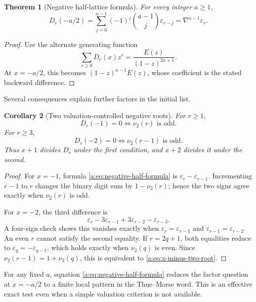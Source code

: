 \documentclass[11pt,a4paper,oneside,openany]{book}
\numberwithin{equation}{chapter}
\newtheorem{theorem}{Theorem}[chapter]
\newtheorem{corollary}[theorem]{Corollary}
\theoremstyle{definition}
\theoremstyle{remark}
\newcommand{\eps}{\varepsilon}
\newcommand{\nuTwo}{\nu_2}
\newcommand{\Diag}{D}
\begin{document}
\begin{theorem}[Negative half-lattice formula]\label{a:thm:negative-half}
For every integer \(a\ge1\),
\begin{equation}
 \boxed{
 \Diag_r(-a/2)
 =\sum_{j=0}^{a-1}(-1)^j\binom{a-1}{j}\eps_{r-j}
 =\nabla^{a-1}\eps_r.}
 \label{a:eq:negative-half-formula}
\end{equation}
\end{theorem}

\begin{proof}
Use the alternate generating function
\[
 \sum_{r\ge0}\Diag_r(x)z^r
 =\frac{E(z)}{(1-z)^{2x+1}}.
\]
At \(x=-a/2\), this becomes \((1-z)^{a-1}E(z)\), whose coefficient is the
stated backward difference.
\end{proof}

Several consequences explain further factors in the initial list.

\begin{corollary}[Two valuation-controlled negative roots]\label{a:cor:valuation-roots}
For \(r\ge1\),
\begin{equation}
 \Diag_r(-1)=0
 \iff \nuTwo(r)\text{ is odd}.
 \label{a:eq:x-minus-one-root}
\end{equation}
For \(r\ge3\),
\begin{equation}
 \Diag_r(-2)=0
 \iff \nuTwo(r-1)\text{ is odd}.
 \label{a:eq:x-minus-two-root}
\end{equation}
Thus \(x+1\) divides \(\Diag_r\) under the first condition, and \(x+2\)
divides it under the second.
\end{corollary}

\begin{proof}
For \(x=-1\), formula \eqref{a:eq:negative-half-formula} is
\(\eps_r-\eps_{r-1}\).  Incrementing \(r-1\) to \(r\) changes the binary
digit sum by \(1-\nuTwo(r)\); hence the two signs agree exactly when
\(\nuTwo(r)\) is odd.

For \(x=-2\), the third difference is
\[
 \eps_r-3\eps_{r-1}+3\eps_{r-2}-\eps_{r-3}.
\]
A four-sign check shows this vanishes exactly when
\(\eps_r=\eps_{r-3}\) and \(\eps_{r-1}=\eps_{r-2}\).  An even \(r\) cannot
satisfy the second equality.  If \(r=2q+1\), both equalities reduce to
\(\eps_q=-\eps_{q-1}\), which holds exactly when \(\nuTwo(q)\) is even.
Since \(\nuTwo(r-1)=1+\nuTwo(q)\), this is equivalent to
\eqref{a:eq:x-minus-two-root}.
\end{proof}

For any fixed \(a\), equation \eqref{a:eq:negative-half-formula} reduces the
factor question at \(x=-a/2\) to a finite local pattern in the Thue--Morse
word.  This is an effective exact test even when a simple valuation criterion
is not available.
\end{document}
